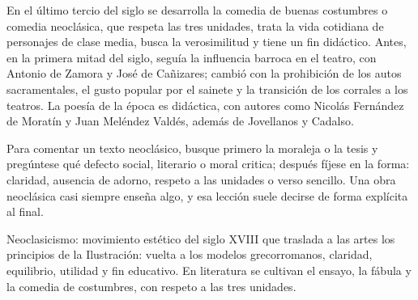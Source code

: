 \documentclass{book}
\begin{document}
En el último tercio del siglo se desarrolla la comedia de buenas costumbres o comedia neoclásica, que respeta las tres unidades, trata la vida cotidiana de personajes de clase media, busca la verosimilitud y tiene un fin didáctico. Antes, en la primera mitad del siglo, seguía la influencia barroca en el teatro, con Antonio de Zamora y José de Cañizares; cambió con la prohibición de los autos sacramentales, el gusto popular por el sainete y la transición de los corrales a los teatros. La poesía de la época es didáctica, con autores como Nicolás Fernández de Moratín y Juan Meléndez Valdés, además de Jovellanos y Cadalso.


\begin{tcolorbox}[title={Consejo}, studiumtip, breakable]

Para comentar un texto neoclásico, busque primero la moraleja o la tesis y pregúntese qué defecto social, literario o moral critica; después fíjese en la forma: claridad, ausencia de adorno, respeto a las unidades o verso sencillo. Una obra neoclásica casi siempre enseña algo, y esa lección suele decirse de forma explícita al final.

\end{tcolorbox}

\begin{tcolorbox}[title={Definición}, studiumdef, breakable]

Neoclasicismo: movimiento estético del siglo XVIII que traslada a las artes los principios de la Ilustración: vuelta a los modelos grecorromanos, claridad, equilibrio, utilidad y fin educativo. En literatura se cultivan el ensayo, la fábula y la comedia de costumbres, con respeto a las tres unidades.

\end{tcolorbox}
\end{document}
